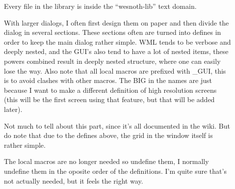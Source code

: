 \begin{description}
	\begin{description}
	\item[]
		Every file in the library is inside the ``wesnoth-lib'' text domain.

	\item[]
		With larger dialogs, I often first design them on paper and then divide the
dialog in several sections. These sections often are turned into defines in
order to keep the main dialog rather simple. WML tends to be verbose and deeply
nested, and the GUI's also tend to have a lot of nested items, these powers
combined result in deeply nested structure, where one can easily lose the way.
Also note that all local macros are prefixed with \_GUI, this is to avoid clashes
with other macros. The BIG in the names are just because I want to make a
different definition of high resolution screens (this will be the first screen
using that feature, but that will be added later).

	\item[]
		Not much to tell about this part, since it's all documented in the wiki. %
But do note that due to the defines above, the grid in the window itself is
rather simple.

	\item[]
		The local macros are no longer needed so undefine them, I normally
undefine them in the oposite order of the definitions. I'm quite sure that's not
actually needed, but it feels the right way\texttrademark.

	\end{description}

\end{description}
